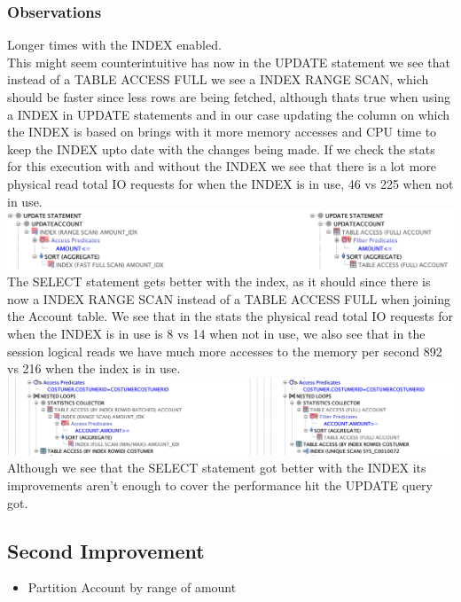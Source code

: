 \documentclass[a4paper, 10pt]{article}
\begin{document}
\subsubsection{Observations}
Longer times with the INDEX enabled.\\ 
This might seem counterintuitive has now in the UPDATE statement we see that instead of a TABLE ACCESS FULL we see a INDEX RANGE SCAN, which should be faster since less rows are being fetched, although thats true when using a INDEX in UPDATE statements and in our case updating the column on which the INDEX is based on brings with it more memory accesses and CPU time to keep the INDEX upto date with the changes being made. If we check the stats for this execution with and without the INDEX we see that there is a lot more physical read total IO requests for when the INDEX is in use, 46 vs 225 when not in use.\\ 
\includegraphics[width=\textwidth,height=\textheight,keepaspectratio]{1UPDATE}\\ 
The SELECT statement gets better with the index, as it should since there is now a INDEX RANGE SCAN instead of a TABLE ACCESS FULL when joining the Account table. We see that in the stats the physical read total IO requests for when the INDEX is in use is 8 vs 14 when not in use, we also see that in the session logical reads we have much more accesses to the memory per second 892 vs 216 when the index is in use.\\
\includegraphics[width=\textwidth,height=\textheight,keepaspectratio]{1selectCompare}\\
Although we see that the SELECT statement got better with the INDEX its improvements aren't enough to cover the performance hit the UPDATE query got.\\
\subsection{Second Improvement}
\begin{itemize}
  \item Partition Account by range of amount
\end{itemize}
\end{document}
